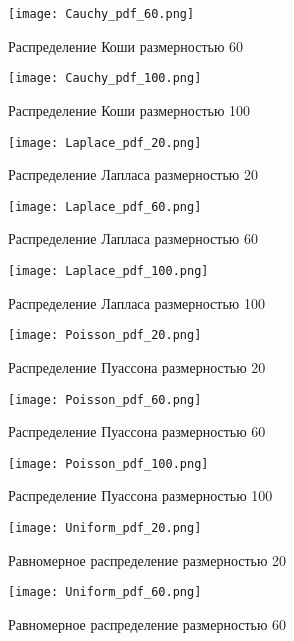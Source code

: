 \documentclass[12pt,a4paper]{article}
\begin{document}
\begin{figure}[H]
    \centering
    \texttt{[image: Cauchy\_pdf\_60.png]}
    \caption{Распределение Коши размерностью 60}
\end{figure}

\begin{figure}[H]
    \centering
    \texttt{[image: Cauchy\_pdf\_100.png]}
    \caption{Распределение Коши размерностью 100}
\end{figure}

\begin{figure}[H]
    \centering
    \texttt{[image: Laplace\_pdf\_20.png]}
    \caption{Распределение Лапласа размерностью 20}
\end{figure}

\begin{figure}[H]
    \centering
    \texttt{[image: Laplace\_pdf\_60.png]}
    \caption{Распределение Лапласа размерностью 60}
\end{figure}

\begin{figure}[H]
    \centering
    \texttt{[image: Laplace\_pdf\_100.png]}
    \caption{Распределение Лапласа размерностью 100}
\end{figure}

\begin{figure}[H]
    \centering
    \texttt{[image: Poisson\_pdf\_20.png]}
    \caption{Распределение Пуассона размерностью 20}
\end{figure}

\begin{figure}[H]
    \centering
    \texttt{[image: Poisson\_pdf\_60.png]}
    \caption{Распределение Пуассона размерностью 60}
\end{figure}

\begin{figure}[H]
    \centering
    \texttt{[image: Poisson\_pdf\_100.png]}
    \caption{Распределение Пуассона размерностью 100}
\end{figure}

\begin{figure}[H]
    \centering
    \texttt{[image: Uniform\_pdf\_20.png]}
    \caption{Равномерное распределение размерностью 20}
\end{figure}

\begin{figure}[H]
    \centering
    \texttt{[image: Uniform\_pdf\_60.png]}
    \caption{Равномерное распределение размерностью 60}
\end{figure}
\end{document}
